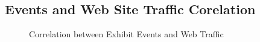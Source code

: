 \subsection{Events and Web Site Traffic Corelation} \label{vizevents}

\begin{figure}
\centering
{}
\caption{Correlation between Exhibit Events and Web Traffic}
\label{fig:EventTraffic}
\end{figure}

